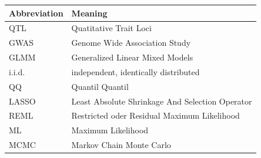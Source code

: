 \documentclass[]{book}
\begin{document}
\begin{tabular}{l|l}
\hline
Abbreviation & Meaning\\
\hline
QTL & Quatitative Trait Loci\\
\hline
GWAS & Genome Wide Association Study\\
\hline
GLMM & Generalized Linear Mixed Models\\
\hline
i.i.d. & independent, identically distributed\\
\hline
QQ & Quantil Quantil\\
\hline
LASSO & Least Absolute Shrinkage And Selection Operator\\
\hline
REML & Restricted oder Residual Maximum Likelihood\\
\hline
ML & Maximum Likelihood\\
\hline
MCMC & Markov Chain Monte Carlo\\
\hline
\end{tabular}


\end{document}
